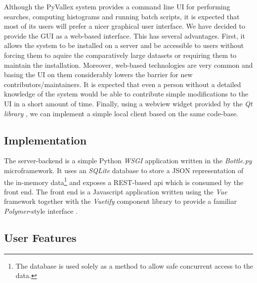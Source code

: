 \documentclass[10pt, a4paper]{article}
\begin{document}
Although the PyVallex system provides a command line UI for performing searches, computing histograms
and running batch scripts, it is expected that most of its users will prefer a nicer graphical user interface.
We have decided to provide the GUI as a web-based interface. This has several advantages. First, it allows
the system to be installed on a server and be accessible to users without forcing them to aquire the comparatively large datasets or requiring them to maintain the installation. Moreover, web-based technologies are very
common and basing the UI on them considerably lowers the barrier for new contributors/maintainers. It
is expected that even a person without a detailed knowledge of the system would be able to contribute simple modifications to the UI in a short amount of time. Finally, using a webview widget provided by the
\emph{Qt library} \cite{tool:Qt},
we can implement a simple local client based on the same code-base.

\subsection{Implementation}
The server-backend is a simple Python \emph{WSGI} \cite{tool:WSGI} application written in the \emph{Bottle.py} \cite{tool:bottle.py}
microframework. It uses an \emph{SQLite} database \cite{tool:SQLite} to store a JSON representation of the in-memory
data\footnote{The database is used solely as a method to allow safe concurrent access to the data.} and exposes a REST-based api which is consumed by the front end. The front end is a Javascript application written using the
\emph{Vue} framework \cite{tool:Vue.js}  together with the 
\emph{Vuetify} component library \cite{tool:Vuetify} to provide a familiar
\emph{Polymer}-style interface \cite{tool:polymer}.

\subsection{User Features}
\end{document}

